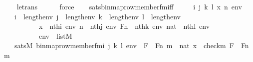 \begin{isabellebody}
\ \ \isamarkupfalse%
\ le{\isacharunderscore}{\kern0pt}trans\ \isanewline
\ \ \ \isamarkupfalse%
\ force\isanewline
\ \ \isamarkupfalse%
%
\endisatagproof
{\isafoldproof}%
%
\isadelimproof
\isanewline
%
\endisadelimproof
\isanewline
{}\isamarkupfalse%
\ sats{\isacharunderscore}{\kern0pt}binmap{\isacharunderscore}{\kern0pt}row{\isacharprime}{\kern0pt}{\isacharunderscore}{\kern0pt}member{\isacharunderscore}{\kern0pt}fm{\isacharunderscore}{\kern0pt}iff\ {\isacharcolon}{\kern0pt}\ \isanewline
\ \ \ i\ j\ k\ l\ x\ n\ env\isanewline
\ \ \ {\isachardoublequoteopen}i\ {\isacharless}{\kern0pt}\ length{\isacharparenleft}{\kern0pt}env{\isacharparenright}{\kern0pt}{\isachardoublequoteclose}\ {\isachardoublequoteopen}j\ {\isacharless}{\kern0pt}\ length{\isacharparenleft}{\kern0pt}env{\isacharparenright}{\kern0pt}{\isachardoublequoteclose}\ {\isachardoublequoteopen}k\ {\isacharless}{\kern0pt}\ length{\isacharparenleft}{\kern0pt}env{\isacharparenright}{\kern0pt}{\isachardoublequoteclose}\ {\isachardoublequoteopen}l\ {\isacharless}{\kern0pt}\ length{\isacharparenleft}{\kern0pt}env{\isacharparenright}{\kern0pt}{\isachardoublequoteclose}\ \isanewline
\ \ \ \ \ \ \ \ \ \ {\isachardoublequoteopen}x\ {\isacharequal}{\kern0pt}\ nth{\isacharparenleft}{\kern0pt}i{\isacharcomma}{\kern0pt}\ env{\isacharparenright}{\kern0pt}{\isachardoublequoteclose}\ {\isachardoublequoteopen}n\ {\isacharequal}{\kern0pt}\ nth{\isacharparenleft}{\kern0pt}j{\isacharcomma}{\kern0pt}\ env{\isacharparenright}{\kern0pt}{\isachardoublequoteclose}\ {\isachardoublequoteopen}Fn\ {\isacharequal}{\kern0pt}\ nth{\isacharparenleft}{\kern0pt}k{\isacharcomma}{\kern0pt}\ env{\isacharparenright}{\kern0pt}{\isachardoublequoteclose}\ {\isachardoublequoteopen}nat\ {\isacharequal}{\kern0pt}\ nth{\isacharparenleft}{\kern0pt}l{\isacharcomma}{\kern0pt}\ env{\isacharparenright}{\kern0pt}{\isachardoublequoteclose}\ \isanewline
\ \ \ \ \ \ \ \ \ \ {\isachardoublequoteopen}env\ {\isasymin}\ list{\isacharparenleft}{\kern0pt}M{\isacharparenright}{\kern0pt}{\isachardoublequoteclose}\isanewline
\ \ \ {\isachardoublequoteopen}sats{\isacharparenleft}{\kern0pt}M{\isacharcomma}{\kern0pt}\ binmap{\isacharunderscore}{\kern0pt}row{\isacharprime}{\kern0pt}{\isacharunderscore}{\kern0pt}member{\isacharunderscore}{\kern0pt}fm{\isacharparenleft}{\kern0pt}i{\isacharcomma}{\kern0pt}\ j{\isacharcomma}{\kern0pt}\ k{\isacharcomma}{\kern0pt}\ l{\isacharparenright}{\kern0pt}{\isacharcomma}{\kern0pt}\ env{\isacharparenright}{\kern0pt}\ {\isasymlongleftrightarrow}\ {\isacharparenleft}{\kern0pt}{\isasymexists}F\ {\isasymin}\ Fn{\isachardot}{\kern0pt}\ {\isasymexists}m\ {\isasymin}\ nat{\isachardot}{\kern0pt}\ x\ {\isacharequal}{\kern0pt}\ {\isacharless}{\kern0pt}check{\isacharparenleft}{\kern0pt}m{\isacharparenright}{\kern0pt}{\isacharcomma}{\kern0pt}\ F{\isachargreater}{\kern0pt}\ {\isasymand}\ F{\isacharbackquote}{\kern0pt}{\isacharless}{\kern0pt}n{\isacharcomma}{\kern0pt}\ m{\isachargreater}{\kern0pt}\ {\isacharequal}{\kern0pt}\ {}{\isacharparenright}{\kern0pt}{\isachardoublequoteclose}\ \isanewline

\end{isabellebody}
